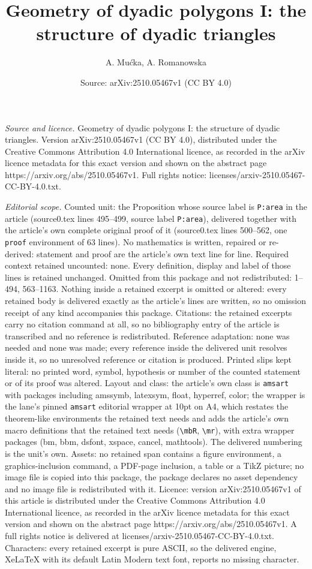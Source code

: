 \documentclass[10pt,a4paper]{amsart}
\title[Geometry of dyadic polygons I: the structure of dyadic trian]{Geometry of dyadic polygons I: the structure of dyadic triangles}
\author{A. Mu\'cka, A. Romanowska}
\date{Source: arXiv:2510.05467v1 (CC BY 4.0)}
\begin{document}
\maketitle

\noindent\emph{Source and licence.} Geometry of dyadic polygons I: the structure of dyadic triangles. Version arXiv:2510.05467v1 (CC BY 4.0), distributed under the Creative Commons Attribution 4.0 International licence, as recorded in the arXiv licence metadata for this exact version and shown on the abstract page https://arxiv.org/abs/2510.05467v1. Full rights notice: licenses/arxiv-2510.05467-CC-BY-4.0.txt.\par\smallskip

\noindent\textit{Editorial scope.} Counted unit: the Proposition whose source label is \texttt{P:area} in the article (source0.tex lines 495--499, source label \texttt{P:area}), delivered together with the article's own complete original proof of it (source0.tex lines 500--562, one \texttt{proof} environment of 63 lines). No mathematics is written, repaired or re-derived: statement and proof are the article's own text line for line. Required context retained uncounted: none. Every definition, display and label of those lines is retained unchanged. Omitted from this package and not redistributed: 1--494, 563--1163. Nothing inside a retained excerpt is omitted or altered: every retained body is delivered exactly as the article's lines are written, so no omission receipt of any kind accompanies this package. Citations: the retained excerpts carry no citation command at all, so no bibliography entry of the article is transcribed and no reference is redistributed. Reference adaptation: none was needed and none was made; every reference inside the delivered unit resolves inside it, so no unresolved reference or citation is produced. Printed slips kept literal: no printed word, symbol, hypothesis or number of the counted statement or of its proof was altered. Layout and class: the article's own class is \texttt{amsart} with packages including amssymb, latexsym, float, hyperref, color; the wrapper is the lane's pinned \texttt{amsart} editorial wrapper at 10pt on A4, which restates the theorem-like environments the retained text needs and adds the article's own macro definitions that the retained text needs (\texttt{\textbackslash mbR}, \texttt{\textbackslash mr}), with extra wrapper packages (bm, bbm, dsfont, xspace, cancel, mathtools). The delivered numbering is the unit's own. Assets: no retained span contains a figure environment, a graphics-inclusion command, a PDF-page inclusion, a table or a TikZ picture; no image file is copied into this package, the package declares no asset dependency and no image file is redistributed with it. Licence: version arXiv:2510.05467v1 of this article is distributed under the Creative Commons Attribution 4.0 International licence, as recorded in the arXiv licence metadata for this exact version and shown on the abstract page https://arxiv.org/abs/2510.05467v1. A full rights notice is delivered at licenses/arxiv-2510.05467-CC-BY-4.0.txt. Characters: every retained excerpt is pure ASCII, so the delivered engine, XeLaTeX with its default Latin Modern text font, reports no missing character.
\end{document}
